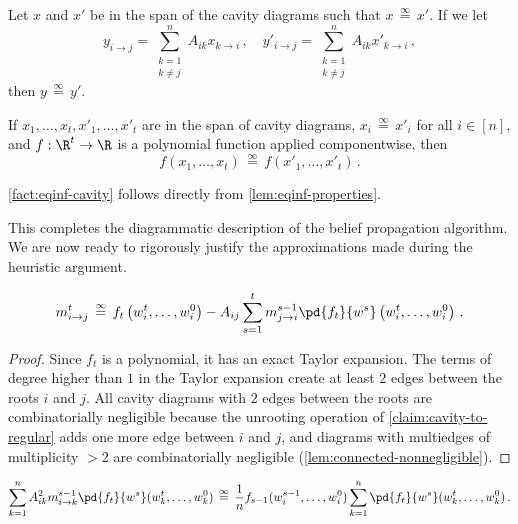 \documentclass[12pt]{article}
\newcommand{\eqinf}{\,\overset{\infty}{=}\,}
\begin{document}
\begin{claim}\label{fact:eqinf-cavity}
    Let $x$ and $x'$ be in the span of the cavity diagrams such that $x\eqinf x'$.
    If we let
    \[
        y_{i\to j} = \sum_{\substack{k=1\\k\neq j}}^n A_{ik} x_{k\to i}\,,\quad y'_{i\to j} = \sum_{\substack{k=1\\k\neq j}}^n A_{ik} x'_{k\to i}\,,
    \]
    then $y\eqinf y'$.

    If $x_1, \ldots, x_t, x'_1, \ldots, x'_t$ are in the span of cavity diagrams, $x_i\eqinf x'_i$ for all $i\in [n]$, and $f:\R^t\to \R$ is a polynomial function applied componentwise, then
    \[
        f(x_1, \ldots, x_t)\eqinf f(x'_1, \ldots, x'_t)\,.
    \]
\end{claim}

\cref{fact:eqinf-cavity} follows directly from \cref{lem:eqinf-properties}.





This completes the diagrammatic description of the belief
propagation algorithm.
We are now ready to rigorously justify the approximations made during the heuristic argument.


\begin{lemma}
    \[
        m^{t}_{i\to j} \eqinf f_{t}\left(w^{t}_i, \ldots, w_i^0\right) - A_{ij}\sum_{s = 1}^{t} m_{j \to i}^{s-1} \pd{f_{t}}{w^s}\left(w^{t}_i, \ldots, w_i^0\right)\,.
    \]
\end{lemma}

\begin{proof}
    Since $f_t$ is a polynomial, it has an exact Taylor expansion. The terms of degree higher than $1$ in the Taylor expansion create at least $2$ edges between the roots $i$ and $j$. All cavity diagrams with $2$ edges between the roots are combinatorially negligible because the unrooting operation of \cref{claim:cavity-to-regular} adds one more edge between $i$ and $j$, and diagrams with multiedges of multiplicity $>2$ are combinatorially negligible (\cref{lem:connected-nonnegligible}).
\end{proof}

\begin{lemma}
    \[
        \sum_{k=1}^n A_{ik}^2 m_{i\to k}^{s-1} \pd{f_t}{w^s}(w_k^t, \dots, w_k^0) \eqinf \frac 1 n f_{s-1}(w^{s-1}_i,\ldots,w^0_i) \sum_{k=1}^n \pd{f_t}{w^s}(w_k^t, \dots, w_k^0)\,.
    \]
\end{lemma}
\end{document}
